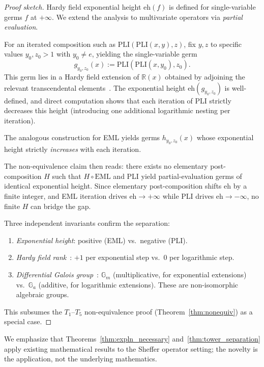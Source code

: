 \documentclass[10pt,twocolumn]{article}
\theoremstyle{remark}
\begin{document}
\begin{proof}[Proof sketch]
Hardy field exponential height $\mathrm{eh}(f)$ is defined for single-variable germs $f$ at $+\infty$. We extend the analysis to multivariate operators via \emph{partial evaluation}.

For an iterated composition such as $\mathrm{PLI}(\mathrm{PLI}(x,y),z)$, fix $y, z$ to specific values $y_0, z_0 > 1$ with $y_0 \neq e$, yielding the single-variable germ
\[
g_{y_0, z_0}(x) := \mathrm{PLI}(\mathrm{PLI}(x, y_0), z_0).
\]
This germ lies in a Hardy field extension of $\mathbb{R}(x)$ obtained by adjoining the relevant transcendental elements~\cite{vdDMM2001}. The exponential height $\mathrm{eh}(g_{y_0, z_0})$ is well-defined, and direct computation shows that each iteration of PLI strictly decreases this height (introducing one additional logarithmic nesting per iteration).

The analogous construction for EML yields germs $h_{y_0, z_0}(x)$ whose exponential height strictly \emph{increases} with each iteration.

The non-equivalence claim then reads: there exists no elementary post-composition $H$ such that $H \circ \mathrm{EML}$ and PLI yield partial-evaluation germs of identical exponential height. Since elementary post-composition shifts $\mathrm{eh}$ by a finite integer, and EML iteration drives $\mathrm{eh} \to +\infty$ while PLI drives $\mathrm{eh} \to -\infty$, no finite $H$ can bridge the gap.

Three independent invariants confirm the separation:
\begin{enumerate}
\item \emph{Exponential height}: positive (EML) vs.\ negative (PLI).
\item \emph{Hardy field rank}~\cite{rosenlicht1983}: $+1$ per exponential step vs.\ $0$ per logarithmic step.
\item \emph{Differential Galois group}~\cite{putSinger2003}: $\mathbb{G}_m$ (multiplicative, for exponential extensions) vs.\ $\mathbb{G}_a$ (additive, for logarithmic extensions). These are non-isomorphic algebraic groups.
\end{enumerate}
This subsumes the $T_1$--$T_5$ non-equivalence proof (Theorem~\ref{thm:nonequiv}) as a special case.
\end{proof}

We emphasize that Theorems~\ref{thm:expln_necessary} and~\ref{thm:tower_separation} apply existing mathematical results to the Sheffer operator setting; the novelty is the application, not the underlying mathematics.
\end{document}
